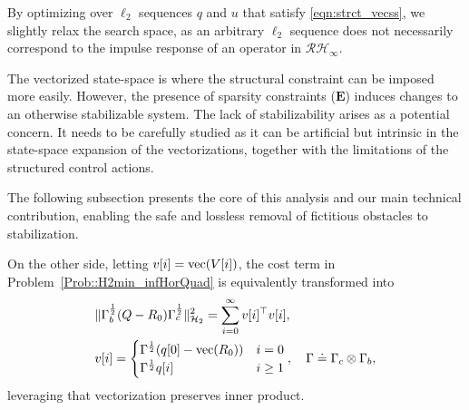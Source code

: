 \begin{rem}
By optimizing over \(\ell_2\) sequences \(q\) and \(u\) that satisfy \eqref{eqn:strct_vecss}, we slightly relax the search space, as an arbitrary \(\ell_2\) sequence does not necessarily correspond to the impulse response of an operator in \(\mathcal{RH}_\infty\).
\end{rem}
\begin{rem} The vectorized state-space is where the structural constraint can be imposed more easily. However, the presence of sparsity constraints (\(\mathbf{E}\)) induces changes to an otherwise stabilizable system. The lack of stabilizability arises as a potential concern. It needs to be carefully studied as it can be artificial but intrinsic in the state-space expansion of the vectorizations, together with the limitations of the structured control actions.

The following subsection presents the core of this analysis and our main technical contribution, enabling the safe and lossless removal of fictitious obstacles to stabilization.
\end{rem}

On the other side, letting \(v[i] = {\mathrm{vec}}(V[i])\), the cost term in Problem~\ref{Prob::H2min_infHorQuad} is equivalently transformed into
\begin{align}\label{eqn:veccost}
    & \|\Gamma_b^{\frac{1}{2}}(Q-R_0) \Gamma_c^{\frac{1}{2}}\|_{\mathcal{H}_2}^2   = \sum_{i=0}^{\infty} v[i]^\top v[i], \\
    & v[i] = \begin{cases}
        \Gamma^{\frac{1}{2}}(q[0]-{\mathrm{vec}}(R_0)) & i = 0\\
        \Gamma^{\frac{1}{2}} q[i] & i \geq 1
    \end{cases},\quad \Gamma \doteq \Gamma_c \otimes \Gamma_b,
\end{align}
leveraging that vectorization preserves inner product.







